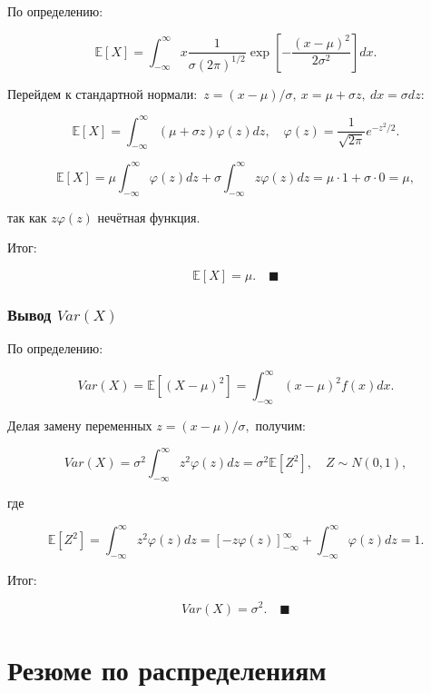 \documentclass[
  russian,
  letterpaper,
]{scrbook}
\begin{document}
По определению:

\[\mathbb{E}[X]=\int_{-\infty}^\infty x\frac{1}{\sigma (2\pi)^{1/2}}\exp\left[-\frac{(x-\mu)^2}{2\sigma^2}\right]dx.\]

Перейдем к стандартной нормали:~\(z=(x−μ)/σ,~x=μ+σz,~dx=σdz:\)

\[\mathbb{E}[X]=\int_{-\infty}^\infty (\mu+\sigma z)\varphi(z)dz, \quad \varphi(z)=\frac{1}{\sqrt{2\pi}}e^{-z^2/2}.\]

\[\mathbb{E}[X]=\mu\int_{-\infty}^\infty \varphi(z)dz+\sigma\int_{-\infty}^\infty z\varphi(z)dz=\mu\cdot1+\sigma\cdot 0=\mu,\]

так как \(z\varphi(z)\) нечётная функция.

Итог:

\[\mathbb{E}[X]=\mu. \quad \blacksquare\]

\subsubsection{\texorpdfstring{\textbf{Вывод}
\(Var(X)\)}{Вывод Var(X)}}\label{ux432ux44bux432ux43eux434-varx}

По определению:

\[Var(X)=\mathbb{E}\left[(X-\mu)^2\right]=\int_{-\infty}^\infty (x-\mu)^2 f(x)dx.\]

Делая замену переменных \(z=(x-\mu)/\sigma,\) получим:

\[Var(X)=\sigma^2\int_{-\infty}^\infty z^2 \varphi(z) dz=\sigma^2 \mathbb{E}\left[Z^2\right], \quad Z\sim N(0,1),\]

где

\[\mathbb{E}\left[Z^2\right]=\int_{-\infty}^\infty z^2 \varphi(z)dz=\left[-z\varphi(z)\right]^{\infty}_{-\infty}+\int_{-\infty}^\infty \varphi(z)dz=1.\]

Итог:

\[Var(X)=\sigma^2. \quad \blacksquare\]

\section{Резюме по
распределениям}\label{ux440ux435ux437ux44eux43cux435-ux43fux43e-ux440ux430ux441ux43fux440ux435ux434ux435ux43bux435ux43dux438ux44fux43c}
\end{document}

